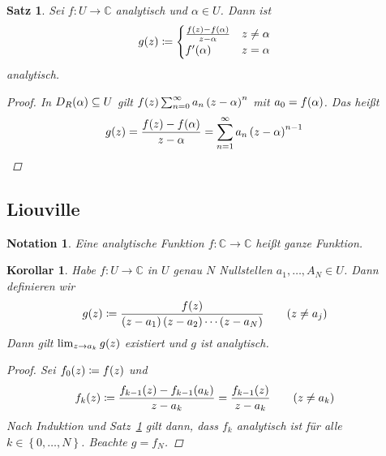 \documentclass[11pt, a4paper]{article}
\theoremstyle{plain}
\newtheorem{satz}[blockelement]{Satz}
\newtheorem{notation}[blockelement]{Notation}
\newtheorem{korollar}[blockelement]{Korollar}
\numberwithin{equation}{subsection}
\newcommand{\set}[1]{\left\{#1\right\}}
\newcommand{\pair}[1]{\left(#1\right)}
\newcommand{\of}[1]{\mathopen{}\mathclose{}\bgroup\left(#1\aftergroup\egroup\right)}
\newcommand{\C}{\mathbb{C}}
\begin{document}
    \begin{satz}
        \label{satz:temp-9}
        Sei $f: U \to \C$ analytisch und $\alpha\in U$. Dann ist
        \begin{align*}
            g\of{z} &\coloneqq \begin{cases}
                                   \frac{f\of{z} - f\of{\alpha}}{z-\alpha} &z\neq \alpha\\
                                   f'\of{\alpha} &z = \alpha
            \end{cases}
        \end{align*}
        analytisch.

        \begin{proof}
            In $D_{R}\of{\alpha} \subseteq U$ gilt $f\of{z} \sum_{n=0}^{\infty} a_n \pair{z-\alpha}^n$ mit $a_0 = f\of{\alpha}$. Das heißt
            \begin{align*}
                g\of{z} &= \frac{f\of{z} - f\of{\alpha}}{z-\alpha} = \sum_{n=1}^{\infty} a_n \pair{z-\alpha}^{n-1}\qedhere
            \end{align*}
        \end{proof}
    \end{satz}

    \subsection{Liouville}

    \begin{notation}
        Eine analytische Funktion $f: \C \to \C$ heißt ganze Funktion.
    \end{notation}

    \begin{korollar}
        Habe $f: U \to \C$ in $U$ genau $N$ Nullstellen $a_1, \ldots, A_N \in U$. Dann definieren wir
        \begin{align*}
            g\of{z} &\coloneqq \frac{f\of{z}}{\pair{z-a_1}\pair{z-a_2}\cdots\pair{z-a_N}}\tag{$z\neq a_j$}
        \end{align*}
        Dann gilt $ \lim_{z\to a_k} g\of{z}$ existiert und $g$ ist analytisch.

        \begin{proof}
            Sei $f_ 0 \of{z} \coloneqq f\of{z}$ und
            \begin{align*}
                f_k\of{z} &\coloneqq \frac{f_{k-1}\of{z} - f_{k-1}\of{a_k}}{z-a_k} = \frac{f_{k-1}\of{z}}{z-a_k}\tag{$z\neq a_k$}
            \end{align*}
            Nach Induktion und Satz~\ref{satz:temp-9} gilt dann, dass $f_k$ analytisch ist für alle $k\in\set{0, \ldots, N}$. Beachte $g = f_N$.
        \end{proof}
    \end{korollar}
\end{document}
